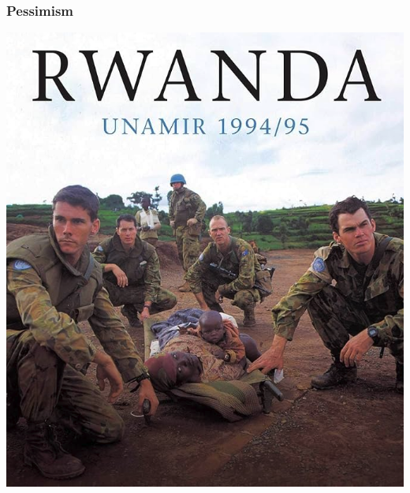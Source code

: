 \documentclass[aspectratio=43]{beamer}
\begin{document}
\begin{frame}
\frametitle{Pessimism}
\centering

\begin{minipage}{.49\textwidth}\centering
  \includegraphics[width = \textwidth]{img/rwanda}
\end{minipage}\hfill
\begin{minipage}{.49\textwidth}\centering

\end{minipage}
\end{frame}
\end{document}
